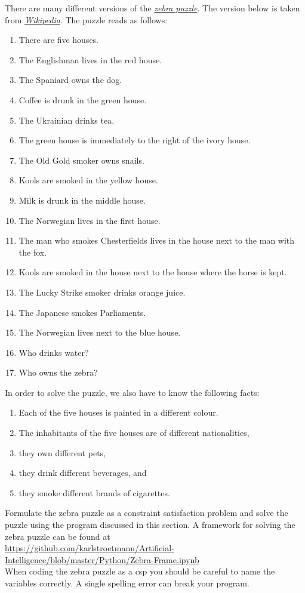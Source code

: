 \exercise
{}
There are many different versions of the \href{https://en.wikipedia.org/wiki/Zebra_Puzzle}{\emph{zebra puzzle}}.  
The version below is taken from \href{https://en.wikipedia.org/wiki/Zebra_Puzzle}{\emph{Wikipedia}}.  The
puzzle reads as follows:
\begin{enumerate}
\item There are five houses.
\item The Englishman lives in the red house.
\item The Spaniard owns the dog.
\item Coffee is drunk in the green house.
\item The Ukrainian drinks tea.
\item The green house is immediately to the right of the ivory house.
\item The Old Gold smoker owns snails.
\item Kools are smoked in the yellow house.
\item Milk is drunk in the middle house.
\item The Norwegian lives in the first house.
\item The man who smokes Chesterfields lives in the house next to the man with the fox.
\item Kools are smoked in the house next to the house where the horse is kept.
\item The Lucky Strike smoker drinks orange juice.
\item The Japanese smokes Parliaments.
\item The Norwegian lives next to the blue house.
\item Who drinks water? 
\item Who owns the zebra?
\end{enumerate}
In order to solve the puzzle, we also have to know the following facts:
\begin{enumerate}
\item Each of the five houses is painted in a {\color{blue}different} colour.
\item The inhabitants of the five houses are of {\color{blue}different} nationalities,
\item they own {\color{blue}different} pets, 
\item they drink {\color{blue}different} beverages, and 
\item they smoke {\color{blue}different} brands of cigarettes. 
\end{enumerate}
Formulate the zebra puzzle as a constraint satisfaction problem and solve the puzzle using the program
discussed in this section.  A framework for solving the zebra
puzzle can be found at 
\\[0.2cm]
\hspace*{0.0cm}
\href{https://github.com/karlstroetmann/Artificial-Intelligence/blob/master/Python/Zebra-Frame.ipynb}{https://github.com/karlstroetmann/Artificial-Intelligence/blob/master/Python/Zebra-Frame.ipynb}
\\[0.2cm]
When coding the zebra puzzle as a \ac{csp} you should be careful to name the variables correctly.  A single
spelling error can break your program.
\eoxs

